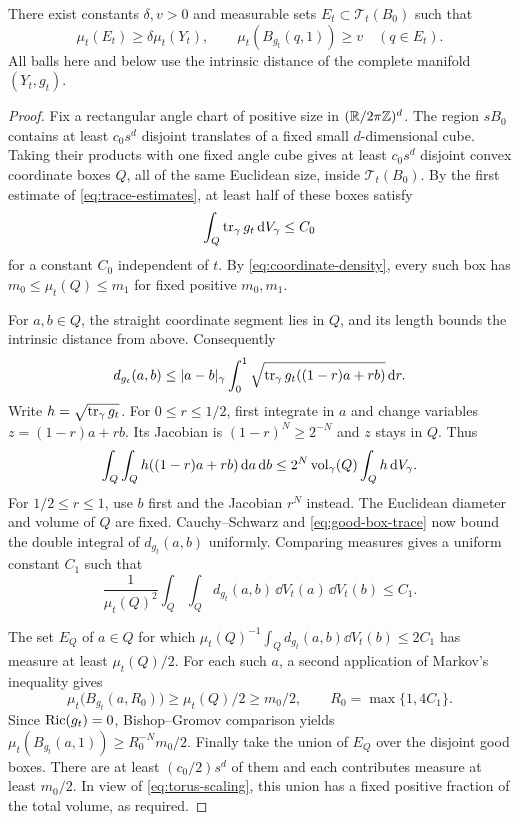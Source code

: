 \begin{lemma}
\label{lem:many-noncollapsed-centers}
There exist constants $\delta,v>0$ and measurable sets
$E_t\subset\mathcal T_t(B_0)$ such that
\begin{equation}
 \mu_t(E_t)\ge\delta\mu_t(Y_t),\qquad
 \mu_t(B_{g_t}(q,1))\ge v\quad(q\in E_t).
 \label{eq:many-noncollapsed-centers}
\end{equation}
All balls here and below use the intrinsic distance of the complete
manifold $(Y_t,g_t)$.
\end{lemma}

\begin{proof}
Fix a rectangular angle chart of positive size in $(\mathbb R/2\pi\mathbb Z)^d$.
The region $sB_0$ contains at least $c_0s^d$ disjoint translates of a
fixed small $d$-dimensional cube.  Taking their products with one fixed
angle cube gives at least $c_0s^d$ disjoint convex coordinate boxes $Q$,
all of the same Euclidean size, inside $\mathcal T_t(B_0)$.
By the first estimate of \eqref{eq:trace-estimates}, at least half of
these boxes satisfy
\begin{equation}
 \int_Q\operatorname{tr}_\gamma g_t\,\mathrm d V_\gamma\le C_0
 \label{eq:good-box-trace}
\end{equation}
for a constant $C_0$ independent of $t$.  By
\eqref{eq:coordinate-density}, every such box has
$m_0\le\mu_t(Q)\le m_1$ for fixed positive $m_0,m_1$.

For $a,b\in Q$, the straight coordinate segment lies in $Q$, and its
length bounds the intrinsic distance from above.  Consequently
\[
 d_{g_t}(a,b)\le |a-b|_\gamma
   \int_0^1\sqrt{\operatorname{tr}_\gamma g_t((1-r)a+rb)}\,\mathrm d r.
\]
Write $h=\sqrt{\operatorname{tr}_\gamma g_t}$.  For $0\le r\le1/2$, first integrate
in $a$ and change variables $z=(1-r)a+rb$.  Its Jacobian is
$(1-r)^N\ge2^{-N}$ and $z$ stays in $Q$.  Thus
\[
 \int_Q\int_Q h((1-r)a+rb)\,\mathrm d a\,\mathrm d b
       \le2^N\operatorname{vol}_\gamma(Q)\int_Qh\,\mathrm d V_\gamma.
\]
For $1/2\le r\le1$, use $b$ first and the Jacobian $r^N$ instead.
The Euclidean diameter and volume of $Q$ are fixed.  Cauchy--Schwarz and
\eqref{eq:good-box-trace} now bound the double integral of
$d_{g_t}(a,b)$ uniformly.  Comparing measures gives a uniform constant
$C_1$ such that
\[
 \frac1{\mu_t(Q)^2}\int_Q\int_Qd_{g_t}(a,b)\,
                       \dd V_t(a)\,\dd V_t(b)\le C_1.
\]

The set $E_Q$ of $a\in Q$ for which
$\mu_t(Q)^{-1}\int_Qd_{g_t}(a,b)\dd V_t(b)\le2C_1$
has measure at least $\mu_t(Q)/2$.  For each such $a$, a second application
of Markov's inequality gives
\[
 \mu_t\bigl(B_{g_t}(a,R_0)\bigr)\ge\mu_t(Q)/2\ge m_0/2,
 \qquad R_0=\max\{1,4C_1\}.
\]
Since $\operatorname{Ric}(g_t)=0$, Bishop--Gromov comparison yields
$\mu_t(B_{g_t}(a,1))\ge R_0^{-N}m_0/2$.
Finally take the union of $E_Q$ over the disjoint good boxes.  There are
at least $(c_0/2)s^d$ of them and each contributes measure at least
$m_0/2$.  In view of \eqref{eq:torus-scaling}, this union has a fixed
positive fraction of the total volume, as required.
\end{proof}

